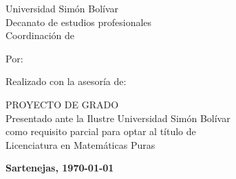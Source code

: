 \bgroup
\centering
\thispagestyle{empty}

\PrintUsbLogo
    {
        Universidad Simón Bolívar\\
        Decanato de estudios profesionales\\
        Coordinación de \coord
    }

\vspace{1.5cm}

\MakeUppercase{\textbf{\textls{
    \wrapto[14cm][\centering]
    {\MainTitle}
}}}

\vspace{1.5cm}

Por:
\\
\autor

\vspace{1.5cm}

Realizado con la asesoría de:
\\
\tutor

\vspace{3cm}

\MakeUppercase{Proyecto de Grado}\\
Presentado ante la Ilustre Universidad Simón Bolívar\\
como requisito parcial para optar al título de\\
Licenciatura en Matemáticas Puras

\vspace{\fill}

\textbf{Sartenejas, \today}\par
\egroup
